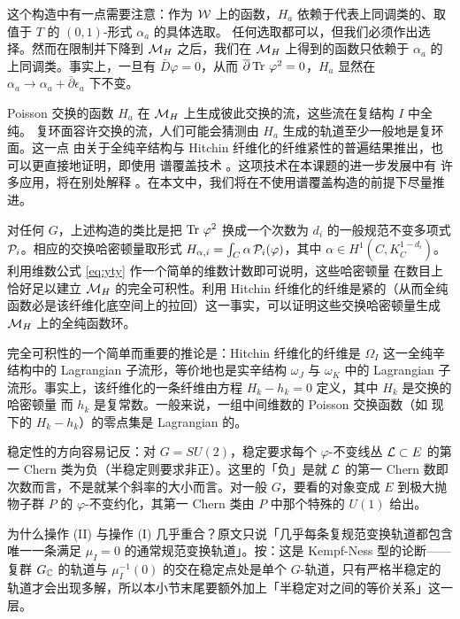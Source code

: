 这个构造中有一点需要注意：作为 $\EUW$ 上的函数，$H_a$
依赖于代表上同调类的、取值于 $T$ 的 $(0,1)$-形式 $\alpha_a$ 的具体选取。
任何选取都可以，但我们必须作出选择。然而在限制并下降到 $\MH$ 之后，我们在 $\MH$ 上得到的函数只依赖于 $\alpha_a$ 的上同调类。事实上，一旦有 $\bar D\varphi=0$，从而
$\bar\partial\Tr\,\varphi^2=0$，$H_a$ 显然在
$\alpha_a\to\alpha_a+\bar\partial\epsilon_a$ 下不变。

Poisson 交换的函数 $H_a$ 在
$\MH$ 上生成彼此交换的流，这些流在复结构 $I$ 中全纯。
复环面容许交换的流，人们可能会猜测由 $H_a$ 生成的轨道至少一般地是复环面。这一点
由关于全纯辛结构与 Hitchin 纤维化的纤维紧性的普遍结果推出，也可以更直接地证明，即使用
谱覆盖技术 \cite{ref20,ref62}。这项技术在本课题的进一步发展中有
许多应用，将在别处解释 \cite{ref26}。在本文中，我们将在不使用谱覆盖构造的前提下尽量推进。

对任何 $G$，上述构造的类比是把 $\Tr\,\varphi^2$ 换成一个次数为 $d_i$ 的一般规范不变多项式 ${\cal
P}_i$。相应的交换哈密顿量取形式 $H_{\alpha,i}=\int_C \alpha \,{\cal P}_i(\varphi)$，其中
$\alpha\in H^1(C,K_C^{1-d_i})$。利用维数公式 \eqref{eq:yty} 作一个简单的维数计数即可说明，这些哈密顿量
在数目上恰好足以建立 $\MH$ 的完全可积性。利用 Hitchin 纤维化的纤维是紧的（从而全纯函数必是该纤维化底空间上的拉回）这一事实，可以证明这些交换哈密顿量生成
$\MH$ 上的全纯函数环。

完全可积性的一个简单而重要的推论是：Hitchin 纤维化的纤维是
$\Omega_I$ 这一全纯辛结构中的 Lagrangian 子流形，等价地也是实辛结构 $\omega_J$ 与
$\omega_K$ 中的 Lagrangian 子流形。事实上，该纤维化的一条纤维由方程 $H_k-h_k=0$ 定义，其中 $H_k$ 是交换的哈密顿量
而 $h_k$ 是复常数。一般来说，一组中间维数的 Poisson 交换函数（如
现下的 $H_k-h_k$）的零点集是 Lagrangian 的。

\begin{yizhu}[易错点]
稳定性的方向容易记反：对 $G=SU(2)$，稳定要求每个 $\varphi$-不变线丛 ${\cal L}\subset E$ 的第一 Chern 类为负（半稳定则要求非正）。这里的「负」是就 ${\cal L}$ 的第一 Chern 数即次数而言，不是就某个斜率的大小而言。对一般 $G$，要看的对象变成 $E$ 到极大抛物子群 $P$ 的 $\varphi$-不变约化，其第一 Chern 类由 $P$ 中那个特殊的 $U(1)$ 给出。
\end{yizhu}

\begin{yizhu}[含糊点拨]
为什么操作 (II) 与操作 (I) 几乎重合？原文只说「几乎每条复规范变换轨道都包含唯一一条满足 $\mu_I=0$ 的通常规范变换轨道」。按：这是 Kempf-Ness 型的论断——复群 $G_{\Bbb{C}}$ 的轨道与 $\mu_I^{-1}(0)$ 的交在稳定点处是单个 $G$-轨道，只有严格半稳定的轨道才会出现多解，所以本小节末尾要额外加上「半稳定对之间的等价关系」这一层。
\end{yizhu}

